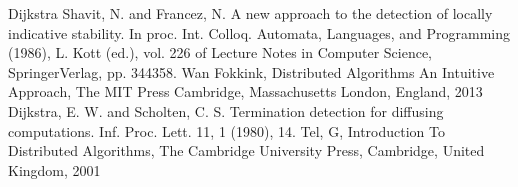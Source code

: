 \documentclass[letterpaper,10pt,english]{sphinxmanual}
\begin{document}
\begin{sphinxthebibliography}{Dijkstra}
\sphinxAtStartPar
Shavit, N. and Francez, N. A new approach to the detection of locally indicative stability. In proc. Int. Colloq. Automata, Languages, and Programming (1986), L. Kott (ed.), vol. 226 of Lecture Notes in Computer Science, Springer\sphinxhyphen{}Verlag, pp. 344\sphinxhyphen{}358.
\sphinxAtStartPar
Wan Fokkink, Distributed Algorithms An Intuitive Approach, The MIT Press Cambridge, Massachusetts London, England, 2013
\sphinxAtStartPar
Dijkstra, E. W. and Scholten, C. S. Termination detection for diffusing computations. Inf. Proc. Lett. 11, 1 (1980), 1\sphinxhyphen{}4.
\sphinxAtStartPar
Tel, G, Introduction To Distributed Algorithms, The Cambridge University Press, Cambridge, United Kingdom, 2001
\end{sphinxthebibliography}


\renewcommand{\indexname}{Python Module Index}
\begin{sphinxtheindex}
\let\bigletter\sphinxstyleindexlettergroup
\bigletter{s}
\item\relax{}
\end{sphinxtheindex}

\renewcommand{\indexname}{Index}
\printindex
\end{document}
